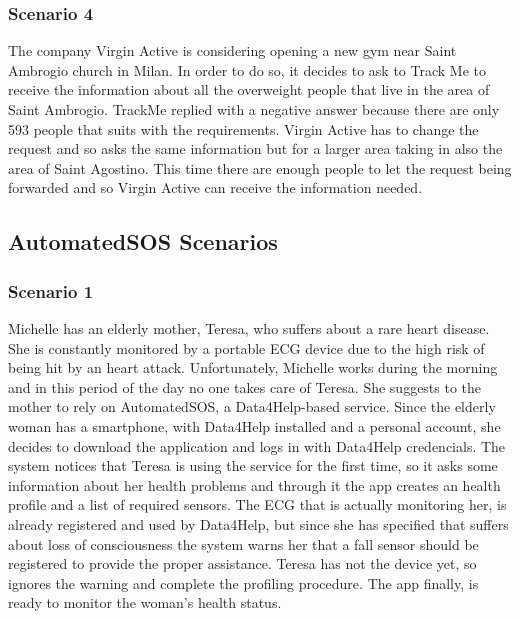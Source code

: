 {\color{Blue}\subsubsection{Scenario 4}}
The company Virgin Active is considering opening a new gym near Saint Ambrogio church in Milan. In order to do so, it decides to ask to Track Me to receive the information about all the overweight people that live in the area of Saint Ambrogio. TrackMe replied with a negative answer because there are only 593 people that suits with the requirements. Virgin Active has to change the request and so asks the same information but for a larger area taking in also the area of Saint Agostino. This time there are enough people to let the request being forwarded and so Virgin Active can receive the information needed.
\paragraph{}


{\color{Blue}\subsection{AutomatedSOS Scenarios}}
{\color{Blue}\subsubsection{Scenario 1}}
Michelle has an elderly mother, Teresa, who suffers about a rare heart disease. She is constantly monitored by a portable ECG device due to the high risk of being hit by an heart attack. Unfortunately, Michelle works during the morning and in this period of the day no one takes care of Teresa. She suggests to the mother to rely on AutomatedSOS, a Data4Help-based service. Since the elderly woman has a smartphone, with Data4Help installed and a personal account, she decides to download the application and logs in with Data4Help credencials. The system notices that Teresa is using the service for the first time, so it asks some information about her health problems and through it the app creates an health profile and a list of required sensors. The ECG that is actually monitoring her, is already registered and used by Data4Help, but since she has specified that suffers about loss of consciousness the system warns her that a fall sensor should be registered to provide the proper assistance. Teresa has not the device yet, so ignores the warning and complete the profiling procedure. The app finally, is ready to monitor the woman’s health status.
